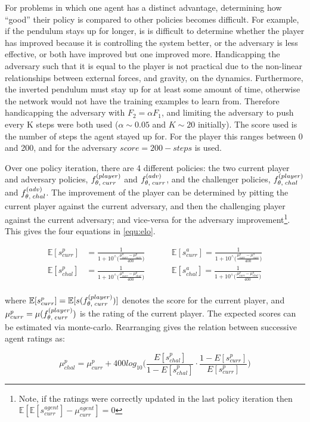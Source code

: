 \documentclass[../main.tex]{subfiles}
\begin{document}
For problems in which one agent has a distinct advantage, determining how ``good'' their policy is compared to other policies becomes difficult. For example, if the pendulum stays up for longer, is is difficult to determine whether the player has improved because it is controlling the system better, or the adversary is less effective, or both have improved but one improved more. Handicapping the adversary such that it is equal to the player is not practical due to the non-linear relationships between external forces, and gravity, on the dynamics. Furthermore, the inverted pendulum must stay up for at least some amount of time, otherwise the network would not have the training examples to learn from. Therefore handicapping the adversary with $F_2 = \alpha F_1$, and limiting the adversary to push every K steps were both used ($\alpha \sim 0.05$ and $K \sim 20$ initially). The score used is the number of steps the agent stayed up for. For the player this ranges between 0 and 200, and for the adversary $score = 200-steps$ is used. 

Over one policy iteration, there are 4 different policies: the two current player and adversary policies, $f_{\theta, \; curr}^{(player)}$ and $f_{\theta, \; curr}^{(adv)}$, and the challenger policies,  $f_{\theta, \; chal}^{(player)}$ and $f_{\theta, \; chal}^{(adv)}$. The improvement of the player can be determined by pitting the current player against the current adversary, and then the challenging player against the current adversary; and vice-versa for the adversary improvement\footnote{Note, if the ratings were correctly updated in the last policy iteration then $\mathbb{E}[\mathbb{E}[s_{curr}^{agent}] - \mu_{curr}^{agent}] = 0$}. This gives the four equations in \cref{equ:elo}.

\begin{align}
   \mathbb{E}[s^p_{curr}] &= \frac{1}{1+10^\wedge \big( \frac{\mu^a_{curr} - \mu^p_{curr}}{400} \big)} \hspace{1cm} &\mathbb{E}[s^a_{curr}] = \frac{1}{1+10^\wedge \big( \frac{\mu^p_{curr} - \mu^a_{curr}}{400} \big)}\\
   \mathbb{E}[s^p_{chal}] &= \frac{1}{1+10^\wedge \big( \frac{\mu^a_{curr} - \mu^p_{chal}}{400} \big)} \hspace{1cm} &\mathbb{E}[s^a_{chal}] = \frac{1}{1+10^\wedge \big( \frac{\mu^p_{curr} - \mu^a_{chal}}{400} \big)}\\
\end{align}

where $\mathbb{E}[s^p_{curr}] = \mathbb{E}[s(f_{\theta, \; curr}^{(player)})]$ denotes the score for the current player, and $\mu^p_{curr} = \mu(f_{\theta, \; curr}^{(player)})$ is the rating of the current player. The expected scores can be estimated via monte-carlo. Rearranging gives the relation between successive agent ratings as:

\begin{equation}
   \mu^p_{chal} = \mu^p_{curr} + 400log_{10} \bigg( \frac{{E}[s^p_{chal}]}{1 - {E}[s^p_{chal}]} \cdot \frac{1 - {E}[s^p_{curr}]}{{E}[s^p_{curr}]}    \bigg)
\end{equation}


\appendix
\onlyinsubfile{}
\end{document}
